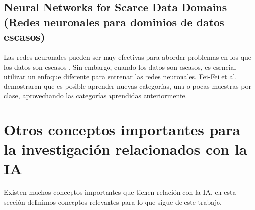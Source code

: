 \doublespacing
\subsection{Neural Networks for Scarce Data Domains  (Redes neuronales para dominios de datos escasos)}
Las redes neuronales pueden ser muy efectivas para abordar problemas en los que los datos son escasos \cite{Carola}. Sin embargo, cuando los datos son escasos, es esencial utilizar un enfoque diferente para entrenar las redes neuronales. Fei-Fei et al. \cite{Fei-Fei2006} demostraron que es posible aprender nuevas categorías, una o pocas muestras por clase, aprovechando las categorías aprendidas anteriormente. \\

\doublespacing
\section{Otros conceptos importantes para la investigación relacionados con la IA}
Existen muchos conceptos importantes que tienen relación con la IA, en esta sección definimos conceptos relevantes para lo que sigue de este trabajo.

\doublespacing
